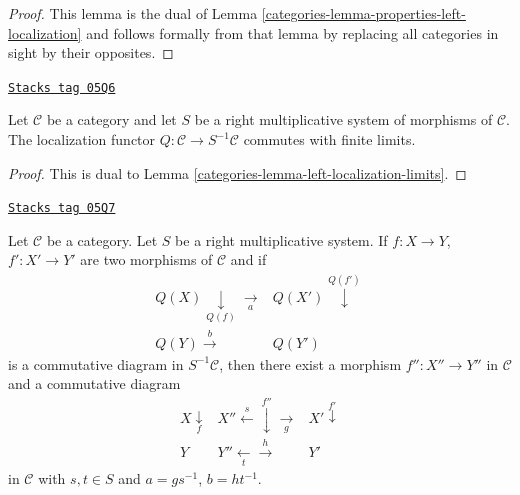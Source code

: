 \begin{proof}

This lemma is the dual of
Lemma \ref{categories-lemma-properties-left-localization}
and follows formally from that lemma by replacing all
categories in sight by their opposites.
\end{proof}

\begin{lemma}
\label{categories-lemma-right-localization-limits}
\href{https://stacks.math.columbia.edu/tag/05Q6}{\texttt{Stacks tag 05Q6}}

Let $\mathcal{C}$ be a category and let $S$ be a right multiplicative
system of morphisms of $\mathcal{C}$. The localization functor
$Q : \mathcal{C} \to S^{-1}\mathcal{C}$ commutes with finite limits.
\end{lemma}

\begin{proof}

This is dual to Lemma \ref{categories-lemma-left-localization-limits}.
\end{proof}

\begin{lemma}
\label{categories-lemma-right-localization-diagram}
\href{https://stacks.math.columbia.edu/tag/05Q7}{\texttt{Stacks tag 05Q7}}

Let $\mathcal{C}$ be a category. Let $S$ be a right multiplicative
system. If $f : X \to Y$, $f' : X' \to Y'$ are two morphisms of
$\mathcal{C}$ and if
$$
\begin{array}{cc}Q(X) \underset{Q(f)}{\downarrow}\underset{a}{\longrightarrow} & Q(X') \overset{Q(f')}{\downarrow} \\ Q(Y) \overset{b}{\longrightarrow} & Q(Y')\end{array}
$$
is a commutative diagram in $S^{-1}\mathcal{C}$, then there exist
a morphism $f'' : X'' \to Y''$ in $\mathcal{C}$ and a commutative
diagram
$$
\begin{array}{ccc}X \underset{f}{\downarrow} & X'' \overset{s}{\longleftarrow}\overset{f''}{\downarrow}\underset{g}{\longrightarrow} & X' \overset{f'}{\downarrow} \\ Y & Y'' \underset{t}{\longleftarrow}\overset{h}{\longrightarrow} & Y'\end{array}
$$
in $\mathcal{C}$ with $s, t \in S$ and $a = gs^{-1}$, $b = ht^{-1}$.
\end{lemma}

